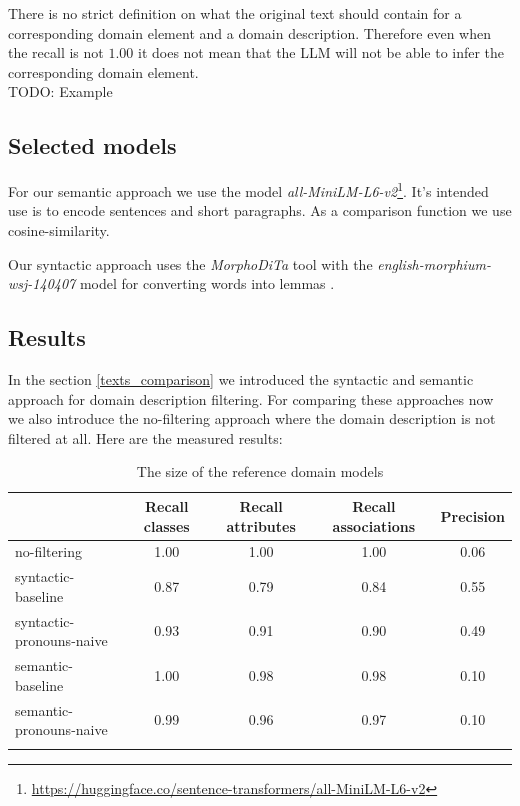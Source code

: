 There is no strict definition on what the original text should contain for a corresponding domain element and a domain description. Therefore even when the recall is not $1.00$ it does not mean that the LLM will not be able to infer the corresponding domain element. \\

TODO: Example \\


\subsection{Selected models}

For our semantic approach we use the model \textit{all-MiniLM-L6-v2}\footnote{\url{https://huggingface.co/sentence-transformers/all-MiniLM-L6-v2}}. It's intended use is to encode sentences and short paragraphs. As a comparison function we use cosine-similarity.

Our syntactic approach uses the \textit{MorphoDiTa} tool \cite{Strakova2014} with the \textit{english-morphium-wsj-140407} model for converting words into lemmas \cite{Straka2014}.


\subsection{Results}

In the section \ref{texts_comparison} we introduced the syntactic and semantic approach for domain description filtering. For comparing these approaches now we also introduce the no-filtering approach where the domain description is not filtered at all. Here are the measured results:

\begin{table}[!h]
    \scriptsize
    \centering
    \setlength{\tabcolsep}{0.5em}
    \begin{tabular}{lcccc}

    \toprule
         & Recall classes & Recall attributes & Recall associations & Precision \\
    \toprule
    
    \addlinespace
         no-filtering      & 1.00  & 1.00  & 1.00 & 0.06 \\
    	 syntactic-baseline & 0.87 & 0.79 & 0.84 & 0.55 \\
         syntactic-pronouns-naive & 0.93  & 0.91  & 0.90 & 0.49 \\
         semantic-baseline & 1.00 & 0.98 & 0.98 & 0.10 \\
         semantic-pronouns-naive & 0.99 & 0.96 & 0.97 & 0.10 \\
    \addlinespace
    \bottomrule
    \addlinespace
    \end{tabular}
    \caption{The size of the reference domain models}
    \label{tab:filtering-results}
\end{table}

